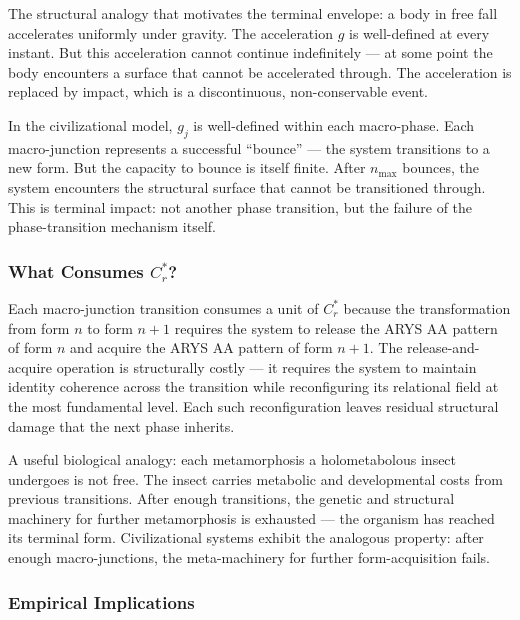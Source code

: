 \documentclass[12pt,a4paper]{article}
\newcommand{\reagmeta}{C_r^{*}}
\newcommand{\gj}{g_j}
\newcommand{\nmax}{n_{\mathrm{max}}}
\begin{document}
The structural analogy that motivates the terminal envelope: a body in free fall accelerates uniformly under gravity. The acceleration $g$ is well-defined at every instant. But this acceleration cannot continue indefinitely --- at some point the body encounters a surface that cannot be accelerated through. The acceleration is replaced by impact, which is a discontinuous, non-conservable event.

In the civilizational model, $\gj$ is well-defined within each macro-phase. Each macro-junction represents a successful ``bounce'' --- the system transitions to a new form. But the capacity to bounce is itself finite. After $\nmax$ bounces, the system encounters the structural surface that cannot be transitioned through. This is terminal impact: not another phase transition, but the failure of the phase-transition mechanism itself.

\subsubsection{What Consumes $\reagmeta$?}

Each macro-junction transition consumes a unit of $\reagmeta$ because the transformation from form $n$ to form $n+1$ requires the system to release the ARYS AA pattern of form $n$ and acquire the ARYS AA pattern of form $n+1$. The release-and-acquire operation is structurally costly --- it requires the system to maintain identity coherence across the transition while reconfiguring its relational field at the most fundamental level. Each such reconfiguration leaves residual structural damage that the next phase inherits.

A useful biological analogy: each metamorphosis a holometabolous insect undergoes is not free. The insect carries metabolic and developmental costs from previous transitions. After enough transitions, the genetic and structural machinery for further metamorphosis is exhausted --- the organism has reached its terminal form. Civilizational systems exhibit the analogous property: after enough macro-junctions, the meta-machinery for further form-acquisition fails.

\subsubsection{Empirical Implications}
\end{document}
